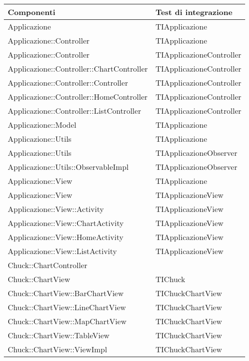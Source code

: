	\begin{longtabu}{| X | X |}

			\hline
			\rowfont{\bf}
			Componenti	&	Test di integrazione \\ \hline 
			\endhead

Applicazione	&	TIApplicazione	\\ \hline
Applicazione::Controller	&	TIApplicazione	\\ \hline
Applicazione::Controller	&	TIApplicazioneController	\\ \hline
Applicazione::Controller::ChartController	&	TIApplicazioneController	\\ \hline
Applicazione::Controller::Controller	&	TIApplicazioneController	\\ \hline
Applicazione::Controller::HomeController	&	TIApplicazioneController	\\ \hline
Applicazione::Controller::ListController	&	TIApplicazioneController	\\ \hline
Applicazione::Model	&	TIApplicazione	\\ \hline
Applicazione::Utils	&	TIApplicazione	\\ \hline
Applicazione::Utils	&	TIApplicazioneObserver	\\ \hline
Applicazione::Utils::ObservableImpl	&	TIApplicazioneObserver	\\ \hline
Applicazione::View	&	TIApplicazione	\\ \hline
Applicazione::View	&	TIApplicazioneView	\\ \hline
Applicazione::View::Activity	&	TIApplicazioneView	\\ \hline
Applicazione::View::ChartActivity	&	TIApplicazioneView	\\ \hline
Applicazione::View::HomeActivity	&	TIApplicazioneView	\\ \hline
Applicazione::View::ListActivity	&	TIApplicazioneView	\\ \hline
Chuck::ChartController	&		\\ \hline
Chuck::ChartView	&	TIChuck	\\ \hline
Chuck::ChartView::BarChartView	&	TIChuckChartView	\\ \hline
Chuck::ChartView::LineChartView	&	TIChuckChartView	\\ \hline
Chuck::ChartView::MapChartView	&	TIChuckChartView	\\ \hline
Chuck::ChartView::TableView	&	TIChuckChartView	\\ \hline
Chuck::ChartView::ViewImpl	&	TIChuckChartView	\\ \hline

\end{longtabu}
